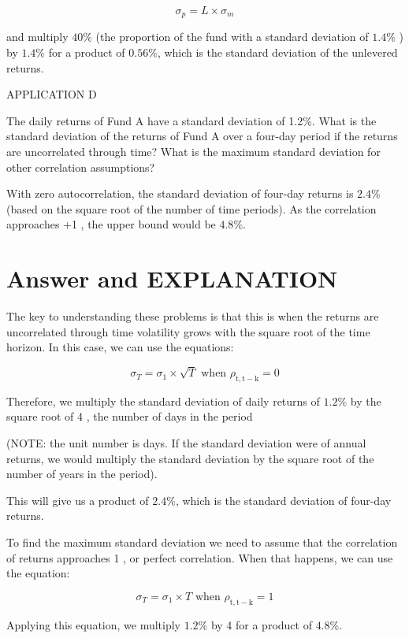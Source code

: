 \documentclass[11pt]{article}
\begin{document}
$$
\sigma_{p}=L \times \sigma_{m}
$$

and multiply $40 \%$ (the proportion of the fund with a standard deviation of $1.4 \%$ ) by $1.4 \%$ for a product of $0.56 \%$, which is the standard deviation of the unlevered returns.

APPLICATION D

The daily returns of Fund A have a standard deviation of 1.2\%. What is the standard deviation of the returns of Fund A over a four-day period if the returns are uncorrelated through time? What is the maximum standard deviation for other correlation assumptions?

With zero autocorrelation, the standard deviation of four-day returns is $2.4 \%$ (based on the square root of the number of time periods). As the correlation approaches +1 , the upper bound would be $4.8 \%$.

\section*{Answer and EXPLANATION}
The key to understanding these problems is that this is when the returns are uncorrelated through time volatility grows with the square root of the time horizon. In this case, we can use the equations:

$$
\sigma_{T}=\sigma_{1} \times \sqrt{T} \text { when } \rho_{\mathrm{t}, \mathrm{t}-\mathrm{k}}=0
$$

Therefore, we multiply the standard deviation of daily returns of $1.2 \%$ by the square root of 4 , the number of days in the period

(NOTE: the unit number is days. If the standard deviation were of annual returns, we would multiply the standard deviation by the square root of the number of years in the period).

This will give us a product of $2.4 \%$, which is the standard deviation of four-day returns.

To find the maximum standard deviation we need to assume that the correlation of returns approaches 1 , or perfect correlation. When that happens, we can use the equation:

$$
\sigma_{T}=\sigma_{1} \times T \text { when } \rho_{\mathrm{t}, \mathrm{t}-\mathrm{k}}=1
$$

Applying this equation, we multiply $1.2 \%$ by 4 for a product of $4.8 \%$.
\end{document}

